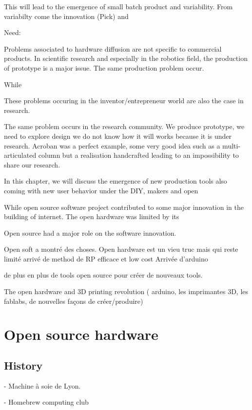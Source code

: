 This will lead to the emergence of small batch product and variability.
From variabilty come the innovation (Pick) and


Need:

Problems associated to hardware diffusion are not specific to commercial products.
In scientific research and especially in the robotics field, the production of prototype is a major issue.
The same production problem occur.

While

These problems occuring in the inventor/entrepreneur world are also the case in research.

The same problem occurs in the research community.
We produce prototype, we need to explore design we do not know how it will works because it is under research.
Acroban was a perfect example, some very good idea such as a multi-articulated column but a realisation handcrafted leading to an impossibility to share our research.

In this chapter, we will discuss the emergence of new production tools also coming with new user behavior under the DIY, makers and open

While open source software project contributed to some major innovation in the building of internet.
The open hardware was limited by its

Open source had a major role on the software innovation.

Open soft a montré des choses.
Open hardware est un vieu truc mais qui reste limité
arrivé de method de RP efficace et low cost
Arrivée d'arduino

de plus en plus de tools open source pour créer de nouveaux tools.


The open hardware and 3D printing revolution ( arduino, les imprimantes 3D, les fablabs, de nouvelles façons de créer/produire)

\section{Open source hardware} %

\subsection{History} %
- Machine à soie de Lyon.

- Homebrew computing club


